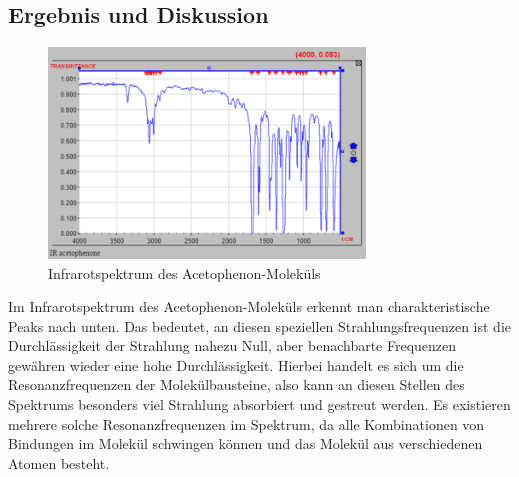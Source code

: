 \documentclass{scrartcl}
\begin{document}
\subsection{Ergebnis und Diskussion}

\begin{figure}[h]
  \caption{Infrarotspektrum des Acetophenon-Moleküls}
  \centering
    \includegraphics[width=0.75\textwidth]{acetophenon.png}
\end{figure}
Im Infrarotspektrum des Acetophenon-Moleküls erkennt man charakteristische Peaks nach unten. Das bedeutet, an diesen speziellen Strahlungsfrequenzen ist die Durchlässigkeit der Strahlung nahezu Null, aber benachbarte Frequenzen gewähren wieder eine hohe Durchlässigkeit. Hierbei handelt es sich um die Resonanzfrequenzen der Molekülbausteine, also kann an diesen Stellen des Spektrums besonders viel Strahlung absorbiert und gestreut werden. Es existieren mehrere solche Resonanzfrequenzen im Spektrum, da alle Kombinationen von Bindungen im Molekül schwingen können und das Molekül aus verschiedenen Atomen besteht.
\end{document}
